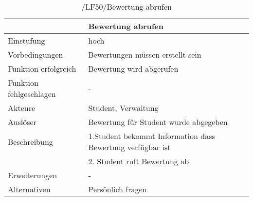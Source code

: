 	\begin{table}[H]
		\centering
		\caption{/LF50/Bewertung abrufen}
		\begin{tabularx}{\textwidth}{l|X}
			\toprule
			                        &                                          Bewertung abrufen \\ \midrule
			             Einstufung &                                                       hoch \\
			         Vorbedingungen &                           Bewertungen müssen erstellt sein \\
			   Funktion erfolgreich &                                   Bewertung wird abgerufen \\
			Funktion fehlgeschlagen &                                                          - \\
			                Akteure &                                        Student, Verwaltung \\
			               Auslöser &                      Bewertung für Student wurde abgegeben \\
			           Beschreibung & 1.Student bekommt Information dass Bewertung verfügbar ist \\
			                        &                               2. Student ruft Bewertung ab \\
			          Erweiterungen &                                                          - \\
			           Alternativen &                                          Persönlich fragen \\ \bottomrule
		\end{tabularx}%
		\label{tab:LF50holeBew}%
	\end{table}%
	
